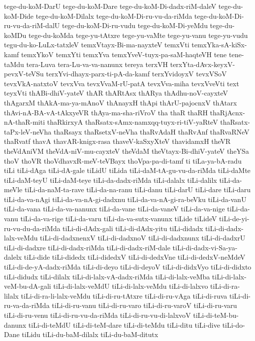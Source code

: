 {tege-du-koM-DarU
tege-du-koM-Dare
tege-du-koM-Di-dadx-riM-daleV
tege-du-koM-Dide
tege-du-koM-Dilalx
tege-du-koM-Di-ru-vu-da-riMda
tege-du-koM-Di-ru-vu-da-riM-dalU
tege-du-koM-Di-ru-vudu
tege-du-koM-Di-yeMdu
tege-du-koMDu
tege-du-koMda
tege-yu-tAtxre
tege-yu-vaMte
tege-yu-vanu
tege-yu-vudu
tegu-du-ko-LuLx-tatxleV
temxVtayx-Bi-ma-nayxteV
temxVti
temxYka-sA-kiSx-kamf
temxYkoV
temxYti
temxYva
temxYveV-tuyx-pa-saM-haqteVH
tene
tene-taMdu
tera-Luva
tera-Lu-va-va-nanunx
tereya
terxVH
terxYta-dAvx-keyxV-pevxV-teVSu
terxYvi-dhayx-parx-ti-pA-da-kamf
terxYvidoyxV
tevxVSoV
tevxVkA-natxtoV
tevxVva
tevxVvaM-rU-patA
tevxVva-miha
tevxVveVti
text
teyxVti
thABi-dhiV-yateV
thAR
thARtAsx
thARya
thAdhu-noV-cayxteV
thAgarxM
thAkA-ma-ya-mAnoV
thAnayxH
thApi
thArU-pajocnxV
thAtarx
thAvi-nA-BA-vA-tAkxyeVR
thAya-ma-sha-riVroV
tha
thaR
thaRH
thaRjAcnx-nA-thaR-miti
thaRkirxyA
thaRsatx-sAmx-namxqq-tuyx-ri-tiV-yaRteV
thaRsatx-taPx-leV-neVha
thaRsayx
thaRsetxV-neVha
thaRvAdaH
thaRvAnf
thaRvaRNeV
thaRvatf
thavA
thavAR-knigx-rasa
thaveV-kaSxyXteV
thavidamxH
theVR
theVdAniVM
theVdA-niV-mu-cayxteV
theVdaM
theVtayx-Bi-dhiV-yateV
theYSa
thoV
thoVR
thoVdhavxR-meV-teVBayx
thoVpa-pa-di-tamf
ti
tiLa-ya-bA-radu
tiLi
tiLi-dAga
tiLi-dA-gale
tiLidU
tiLida
tiLi-daM-tA-gu-vu-da-riMda
tiLi-daMte
tiLi-daM-teyU
tiLi-daM-teye
tiLi-da-dadx-riMda
tiLi-dalalx
tiLi-dalilx
tiLi-da-meVle
tiLi-da-naM-ta-rave
tiLi-da-na-ranu
tiLi-danu
tiLi-darU
tiLi-dare
tiLi-daru
tiLi-da-va-nAgi
tiLi-da-va-nA-gi-dadxnu
tiLi-da-va-nA-gi-ra-beVku
tiLi-da-vanU
tiLi-da-vana
tiLi-da-va-nanunx
tiLi-da-vane
tiLi-da-vaneV
tiLi-da-va-nige
tiLi-da-vanu
tiLi-da-va-rige
tiLi-da-varu
tiLi-da-va-sutx-vanunx
tiLide
tiLideV
tiLi-de-yi-ru-vu-du-da-riMda
tiLi-di-dAdx-gali
tiLi-di-dAdx-yitu
tiLi-didadx
tiLi-di-dadx-lalx-veMdu
tiLi-di-dadxnenxV
tiLi-di-dadxnoV
tiLi-di-dadxnunx
tiLi-di-dadxrU
tiLi-di-dadxre
tiLi-di-dadx-riMda
tiLi-di-dadx-riM-dale
tiLi-di-dadx-vi-Sa-ya-dalelx
tiLi-dide
tiLi-didedx
tiLi-didedxV
tiLi-di-dedxVne
tiLi-di-dedxV-neMdeV
tiLi-di-de-yA-dadx-riMda
tiLi-di-deyo
tiLi-di-deyoV
tiLi-di-didxVyo
tiLi-di-didxto
tiLi-didudx
tiLi-dilalx
tiLi-di-lalx-vA-dadx-riMda
tiLi-di-lalx-veMba
tiLi-di-lalx-veM-bu-dA-gali
tiLi-di-lalx-veMdU
tiLi-di-lalx-veMdu
tiLi-di-lalxvo
tiLi-di-ra-lilalx
tiLi-di-ra-li-lalx-veMdu
tiLi-di-ru-tAtxre
tiLi-di-ru-vAga
tiLi-di-ruva
tiLi-di-ru-va-da-riMda
tiLi-di-ru-vanu
tiLi-di-ru-varo
tiLi-di-ru-varoV
tiLi-di-ru-varu
tiLi-di-ru-venu
tiLi-di-ru-vu-da-riMda
tiLi-di-ru-vu-di-lalxvoV
tiLi-di-teM-bu-danunx
tiLi-di-teMdU
tiLi-di-teM-dare
tiLi-di-teMdu
tiLi-ditu
tiLi-dive
tiLi-do-Dane
tiLidu
tiLi-du-baM-dilalx
tiLi-du-baM-ditutx
}

